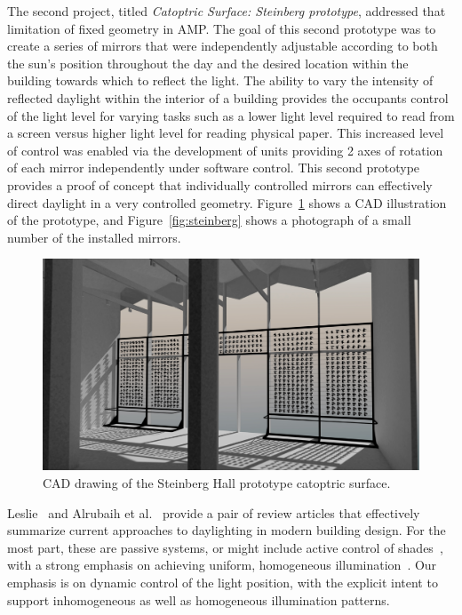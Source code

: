 The second project, titled \emph{Catoptric Surface: Steinberg prototype},
addressed that limitation of fixed geometry in AMP. The goal of this second
prototype was to create a series of mirrors that were independently
adjustable according to both the sun's position throughout the day and the desired
location within the building towards which to reflect the light. The ability to
vary the intensity of reflected daylight within the interior of a
building provides the occupants control of the light level for varying tasks
such as a lower light level required to read from a screen versus higher
light level for reading physical paper. This increased level of control
was enabled via the development of units providing 2 axes of rotation of each mirror
independently under software control. This second prototype provides a proof
of concept that individually controlled mirrors can effectively direct
daylight in a very controlled geometry. 
Figure~\ref{fig:steinberg2} shows a CAD illustration of the prototype,
and Figure~\ref{fig:steinberg} shows a photograph of a small number of
the installed mirrors.

\begin{figure}[ht]
\centering
\includegraphics[width=0.9\linewidth]{figures/steinberg2}
\caption{CAD drawing of the Steinberg Hall prototype catoptric surface.}
\label{fig:steinberg2}
\end{figure}

Leslie~\cite{Leslie03} and Alrubaih et al.~\cite{azaise13} provide
a pair of review articles that effectively summarize current
approaches to daylighting in modern building design.
For the most part, these are passive systems, or might include
active control of shades~\cite{kt16}, with a strong emphasis on
achieving uniform, homogeneous illumination~\cite{bwkk15,gb16}.
Our emphasis is on dynamic control of the light position, with the explicit
intent to support inhomogeneous as well as homogeneous illumination patterns.

